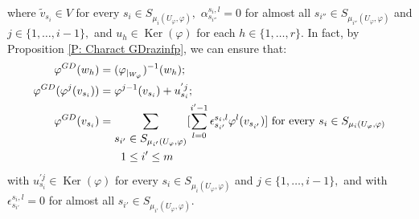\documentclass[10pt,a4paper]{amsart}
\theoremstyle{plain}
\theoremstyle{remark}
\numberwithin{equation}{section} \numberwithin{defn}{section}
\newcommand\Ker{\operatorname{Ker}}
\newcommand{\f}{\varphi}
\begin{document}
where $\tilde{v}_{s_i}\in V$ for every $s_{i}\in S_{{\mu}_{i}(U_\varphi, \varphi)},$  $\alpha_{s_{i''}}^{s_i,l}=0$ for almost all $s_{i''}\in S_{{\mu}_{i''}(U_\varphi, \varphi)}$ and $j\in \{1,\dots,i-1\},$ and $u_h \in \Ker(\f)$ for each $h\in \{1,\dots,r\}.$ In fact, by Proposition \ref{P: Charact GDrazinfp}, we can ensure that: 
\begin{align*}
\f^{GD}(w_h)&=(\f_{\vert_{ W_{\f}}})^{-1}(w_h);\bigskip \\
\f^{GD}(\f^j(v_{s_i}))&=\f^{j-1}(v_{s_i})+u_{s_i}^{'j};\\
\f^{GD}(v_{s_i})&=\underset {\begin{aligned} s_{i'} &\in S_{{\mu}_{i'} (U_\varphi, \varphi)} \\ 1 &\leq i' \leq m \end{aligned}} \sum [\sum_{l=0}^{i'-1} \epsilon_{s_{i'}}^{s_i,l} \varphi^{l} ({{v_{s_{i'}}}})] \text{ for every }s_i\in S_{{\mu}_{i}(U_\varphi, \varphi)}
\end{align*}
 with  $u_{s_i}^{'j}\in \Ker(\f)$ for every $s_i\in S_{{\mu}_{i}(U_\varphi, \varphi)}$ and $j\in \{1,\dots,i-1\},$ and with $\epsilon_{s_{i'}}^{s_i,l}=0$ for almost all $s_{i'}\in S_{{\mu}_{i'} (U_\varphi, \varphi)}.$ 
\end{document}
